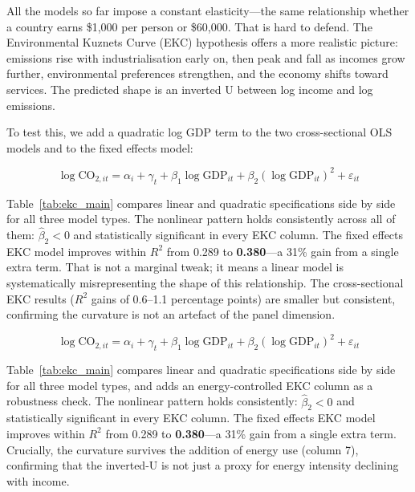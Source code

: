 \documentclass[12pt, a4paper]{article}
\begin{document}
All the models so far impose a constant elasticity---the same relationship whether a country earns \$1,000 per person or \$60,000. That is hard to defend. The Environmental Kuznets Curve (EKC) hypothesis offers a more realistic picture: emissions rise with industrialisation early on, then peak and fall as incomes grow further, environmental preferences strengthen, and the economy shifts toward services. The predicted shape is an inverted U between log income and log emissions.
 
To test this, we add a quadratic log GDP term to the two cross-sectional OLS models and to the fixed effects model:
 
\begin{equation}
    \log \text{CO}_{2,it} = \alpha_i + \gamma_t + \beta_1 \log \text{GDP}_{it} + \beta_2 (\log \text{GDP}_{it})^2 + \varepsilon_{it}
    \label{eq:ekc}
\end{equation}
 
Table~\ref{tab:ekc_main} compares linear and quadratic specifications side by side for all three model types. The nonlinear pattern holds consistently across all of them: $\hat{\beta}_2 < 0$ and statistically significant in every EKC column. The fixed effects EKC model improves within $R^2$ from 0.289 to \textbf{0.380}---a 31\% gain from a single extra term. That is not a marginal tweak; it means a linear model is systematically misrepresenting the shape of this relationship. The cross-sectional EKC results ($R^2$ gains of 0.6--1.1 percentage points) are smaller but consistent, confirming the curvature is not an artefact of the panel dimension.

\begin{equation}
    \log \text{CO}_{2,it} = \alpha_i + \gamma_t + \beta_1 \log \text{GDP}_{it} + \beta_2 (\log \text{GDP}_{it})^2 + \varepsilon_{it}
    \label{eq:ekc}
\end{equation}
 
Table~\ref{tab:ekc_main} compares linear and quadratic specifications side by side for all three model types, and adds an energy-controlled EKC column as a robustness check. The nonlinear pattern holds consistently: $\hat{\beta}_2 < 0$ and statistically significant in every EKC column. The fixed effects EKC model improves within $R^2$ from 0.289 to \textbf{0.380}---a 31\% gain from a single extra term. Crucially, the curvature survives the addition of energy use (column 7), confirming that the inverted-U is not just a proxy for energy intensity declining with income.
 
\end{document}

